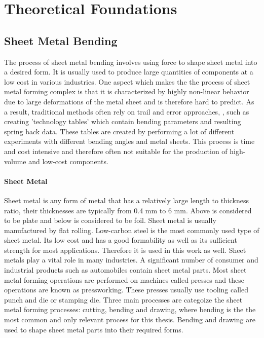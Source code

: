 \chapter{Theoretical Foundations}

\section{Sheet Metal Bending}
The process of sheet metal bending involves using force to shape sheet metal into a desired form. It is usually used to produce large quantities of components at a low cost in various industries. 
\cite[p. 1]{dib_singleensembleclassifiers_2020}
One aspect which makes the the process of sheet metal forming complex is that it is characterized by highly non-linear behavior due to large deformations of the metal sheet and is therefore hard to predict. 
As a result, traditional methods often rely on trail and error approaches, \cite[p. 1]{dib_singleensembleclassifiers_2020}, such as creating 'technology tables' which contain bending parameters and resulting spring back data. These tables are created by performing a lot of different experiments with different bending angles and metal sheets.
This process is time and cost intensive and therefore often not suitable for the production of high-volume and low-cost components.

\subsubsection{Sheet Metal}
Sheet metal is any form of metal that has a relatively large length to thickness ratio, their thicknesses are typically from 0.4 mm to 6 mm. Above is considered to be plate and below is considered to be foil. Sheet metal is usually manufactured by flat rolling.
Low-carbon steel is the most commonly used type of sheet metal. Its low cost and has a good formability as well as its sufficient strength for most applications.
\cite[p. 405]{groover_fundamentalsmodernmanufacturing_2020}
Therefore it is used in this work as well. 
Sheet metals play a vital role in many industries. A significant number of consumer and industrial products such as automobiles contain sheet metal parts.  
Most sheet metal forming operations are performed on machines called presses and these operations are known as pressworking. These presses usually use tooling called punch and die or stamping die. Three main processes are categoize the sheet metal forming processes: cutting, bending and drawing, where bending is the the most common and only relevant process for this thesis.  Bending and drawing are used to shape sheet metal parts into their required forms.
\cite[p. 405]{groover_fundamentalsmodernmanufacturing_2020}


